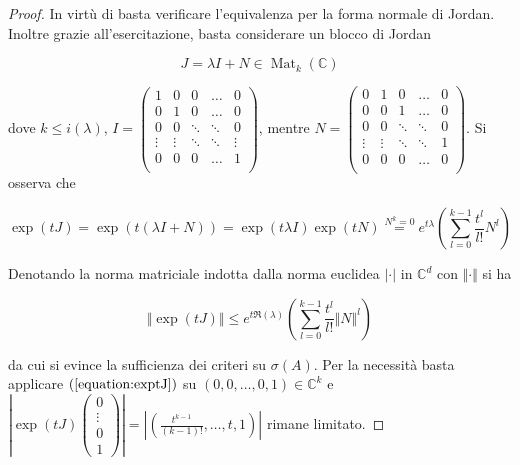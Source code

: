 \documentclass[hidelinks, 10pt]{report}
\DeclareMathOperator{\Mat}{Mat}
\begin{document}
\begin{proof}
In virt\`u di  basta verificare l'equivalenza per la forma normale di Jordan. Inoltre grazie all'esercitazione, basta considerare un blocco di Jordan

\[ J = \lambda I + N \in \Mat_{k} (\mathbb{C}) \]

dove $ k \le i(\lambda) $, $ I = \begin{pmatrix} 
1 & 0 & 0 & \ldots & 0 \\
0 & 1 & 0 & \ldots & 0 \\
0 & 0 & \ddots & \ddots & 0 \\
\vdots & \vdots & \ddots & \ddots & \vdots \\
0 & 0 & 0 & \ldots & 1 \\
\end{pmatrix} $, mentre $ N = \begin{pmatrix}
0 & 1 & 0 & \ldots & 0 \\
0 & 0 & 1 & \ldots & 0 \\
0 & 0 & \ddots & \ddots & 0 \\
\vdots & \vdots & \ddots & \ddots & 1 \\
0 & 0 & 0 & \ldots & 0 \\\end{pmatrix} $. Si osserva che

\begin{equation}	\label{equation:exptJ}
\exp(t J) = \exp(t(\lambda I + N)) = \exp(t \lambda I) \exp(t N) \stackrel{N^{k} = 0}{=} e^{t \lambda} \left( \sum\limits_{l = 0}^{k - 1} \frac{t^{l}}{l!} N^{l} \right)
\end{equation}

Denotando la norma matriciale indotta dalla norma euclidea $ \vert \cdot \vert $ in $ \mathbb{C}^{d} $ con $ \Vert \cdot \Vert $ si ha

\[ \Vert \exp (tJ) \Vert \le e^{t \Re(\lambda)} \left( \sum\limits_{l = 0}^{k - 1} \frac{t^{l}}{l!} \Vert N \Vert^{l} \right) \]

da cui si evince la sufficienza dei criteri su $ \sigma(A) $. Per la necessit\`a basta applicare $ (\ref{equation:exptJ}) $ su $ (0, 0, \dotsc, 0, 1) \in \mathbb{C}^{k} $ e $ \left\vert \exp (t J) \begin{pmatrix} 0 \\ \vdots \\ 0 \\ 1 \end{pmatrix} \right\vert = \left\vert \left( \frac{t^{k - 1}}{(k - 1)!}, \dotsc, t, 1 \right) \right\vert $ rimane limitato.
\end{proof}
\end{document}
